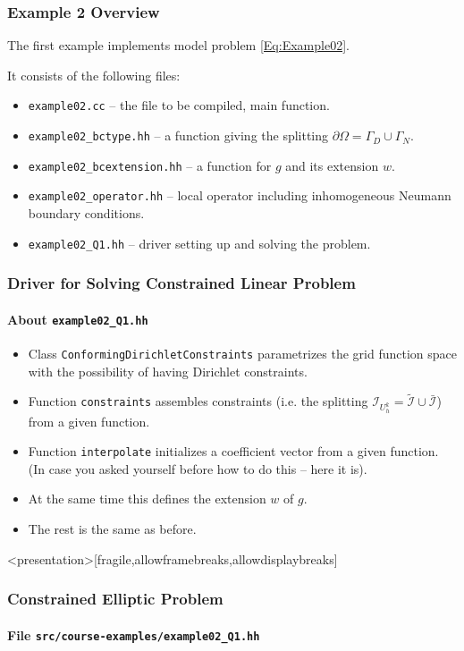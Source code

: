 \begin{frame}
\frametitle{Example 2 Overview}
The first example implements model problem \eqref{Eq:Example02}.

It consists of the following files:
\begin{itemize}
\item \lstinline{example02.cc} -- the file to be compiled, main function.
\item \lstinline{example02_bctype.hh} -- a function giving the splitting $\partial\Omega = \Gamma_D \cup \Gamma_N$.
\item \lstinline{example02_bcextension.hh} -- a function for $g$ and its extension $w$.
\item \lstinline{example02_operator.hh} -- local operator including inhomogeneous Neumann boundary conditions.
\item \lstinline{example02_Q1.hh} -- driver setting up and solving the problem.
\end{itemize}
\end{frame}

\begin{frame}
\frametitle{Driver for Solving Constrained Linear Problem}
\framesubtitle{About \lstinline{example02_Q1.hh}}
\begin{itemize}
\item Class \lstinline{ConformingDirichletConstraints} parametrizes the grid function space
with the possibility of having Dirichlet constraints.
\item Function \lstinline{constraints} assembles constraints (i.e. the splitting
$\mathcal{I}_{U_h^k} = \tilde{\mathcal{I}} \cup \bar{\mathcal{I}}$) from a given function.
\item Function \lstinline{interpolate} initializes a coefficient vector from a given function.
(In case you asked yourself before how to do this -- here it is).
\item At the same time this defines the extension $w$ of $g$.
\item The rest is the same as before.
\end{itemize}
\end{frame}

\begin{frame}<presentation>[fragile,allowframebreaks,allowdisplaybreaks]
\frametitle<presentation>{Constrained Elliptic Problem}
\framesubtitle<presentation>{File \texttt{src/course-examples/example02\_Q1.hh}}

\end{frame}

